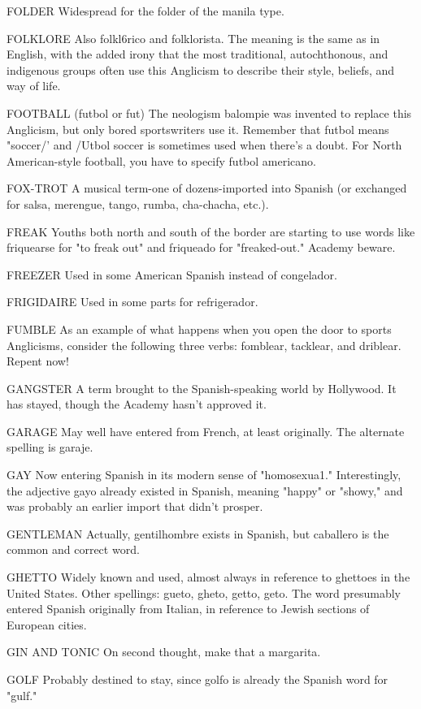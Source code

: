 FOLDER Widespread for the folder of the manila type.

FOLKLORE Also folkl6rico and folklorista. The meaning is
the same as in English, with the added irony that the most traditional,
autochthonous, and indigenous groups often use this Anglicism to describe their style, beliefs, and way of life.

FOOTBALL (futbol or fut) The neologism balompie was invented to replace this Anglicism, but only bored sportswriters use it.
Remember that futbol means "soccer/' and /Utbol soccer is sometimes
used when there's a doubt. For North American-style football, you
have to specify futbol americano.

FOX-TROT A musical term-one of dozens-imported into
Spanish (or exchanged for salsa, merengue, tango, rumba, cha-chacha, etc.).

FREAK Youths both north and south of the border are starting to use words like friquearse for "to freak out" and friqueado for
"freaked-out." Academy beware.

FREEZER Used in some American Spanish instead of
congelador.

FRIGIDAIRE Used in some parts for refrigerador.

FUMBLE As an example of what happens when you open the
door to sports Anglicisms, consider the following three verbs: fomblear, tacklear, and driblear. Repent now!

GANGSTER A term brought to the Spanish-speaking world by
Hollywood. It has stayed, though the Academy hasn't approved it.

GARAGE May well have entered from French, at least originally. The alternate spelling is garaje.

GAY Now entering Spanish in its modern sense of "homosexua1." Interestingly, the adjective gayo already existed in Spanish,
meaning "happy" or "showy," and was probably an earlier import that
didn't prosper.

GENTLEMAN Actually, gentilhombre exists in Spanish, but
caballero is the common and correct word.

GHETTO Widely known and used, almost always in reference
to ghettoes in the United States. Other spellings: gueto, gheto, getto,
geto. The word presumably entered Spanish originally from Italian, in
reference to Jewish sections of European cities.

GIN AND TONIC On second thought, make that a margarita.

GOLF Probably destined to stay, since golfo is already the
Spanish word for "gulf."

